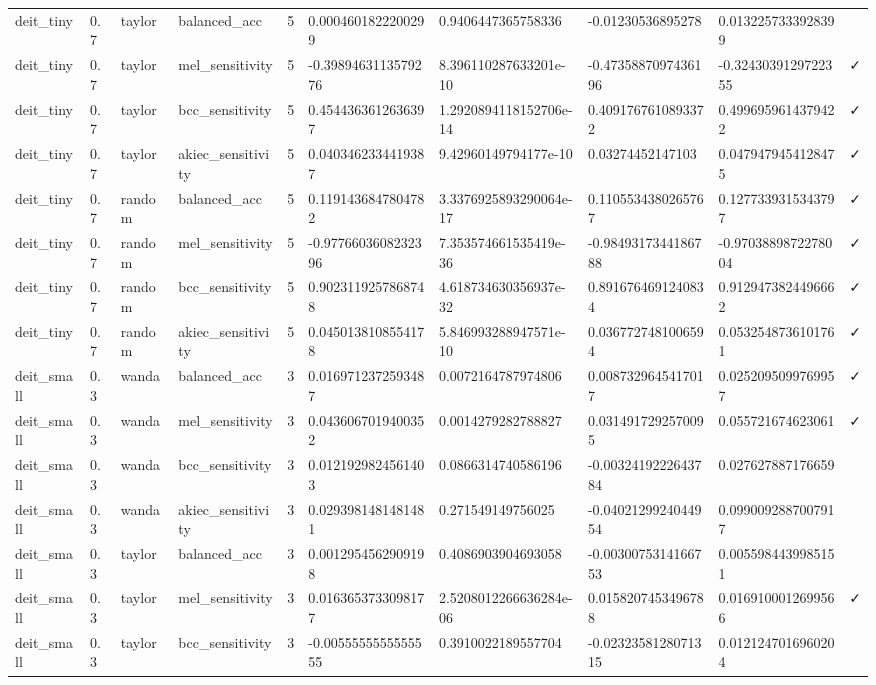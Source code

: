 \begin{table}[t]
\begin{tabular}{llllllllll}
deit\_tiny & 0.7 & taylor & balanced\_acc & 5 & 0.0004601822200299 & 0.9406447365758336 & -0.01230536895278 & 0.0132257333928399 &   \\
deit\_tiny & 0.7 & taylor & mel\_sensitivity & 5 & -0.3989463113579276 & 8.396110287633201e-10 & -0.4735887097436196 & -0.3243039129722355 & ✓ \\
deit\_tiny & 0.7 & taylor & bcc\_sensitivity & 5 & 0.4544363612636397 & 1.2920894118152706e-14 & 0.4091767610893372 & 0.4996959614379422 & ✓ \\
deit\_tiny & 0.7 & taylor & akiec\_sensitivity & 5 & 0.0403462334419387 & 9.42960149794177e-10 & 0.03274452147103 & 0.0479479454128475 & ✓ \\
deit\_tiny & 0.7 & random & balanced\_acc & 5 & 0.1191436847804782 & 3.3376925893290064e-17 & 0.1105534380265767 & 0.1277339315343797 & ✓ \\
deit\_tiny & 0.7 & random & mel\_sensitivity & 5 & -0.9776603608232396 & 7.353574661535419e-36 & -0.9849317344186788 & -0.9703889872278004 & ✓ \\
deit\_tiny & 0.7 & random & bcc\_sensitivity & 5 & 0.9023119257868748 & 4.618734630356937e-32 & 0.8916764691240834 & 0.9129473824496662 & ✓ \\
deit\_tiny & 0.7 & random & akiec\_sensitivity & 5 & 0.0450138108554178 & 5.846993288947571e-10 & 0.0367727481006594 & 0.0532548736101761 & ✓ \\
deit\_small & 0.3 & wanda & balanced\_acc & 3 & 0.0169712372593487 & 0.0072164787974806 & 0.0087329645417017 & 0.0252095099769957 & ✓ \\
deit\_small & 0.3 & wanda & mel\_sensitivity & 3 & 0.0436067019400352 & 0.0014279282788827 & 0.0314917292570095 & 0.055721674623061 & ✓ \\
deit\_small & 0.3 & wanda & bcc\_sensitivity & 3 & 0.0121929824561403 & 0.0866314740586196 & -0.0032419222643784 & 0.027627887176659 &   \\
deit\_small & 0.3 & wanda & akiec\_sensitivity & 3 & 0.0293981481481481 & 0.271549149756025 & -0.0402129924044954 & 0.0990092887007917 &   \\
deit\_small & 0.3 & taylor & balanced\_acc & 3 & 0.0012954562909198 & 0.4086903904693058 & -0.0030075314166753 & 0.0055984439985151 &   \\
deit\_small & 0.3 & taylor & mel\_sensitivity & 3 & 0.0163653733098177 & 2.5208012266636284e-06 & 0.0158207453496788 & 0.0169100012699566 & ✓ \\
deit\_small & 0.3 & taylor & bcc\_sensitivity & 3 & -0.0055555555555555 & 0.3910022189557704 & -0.0232358128071315 & 0.0121247016960204 &   \\

\end{tabular}
\end{table}
